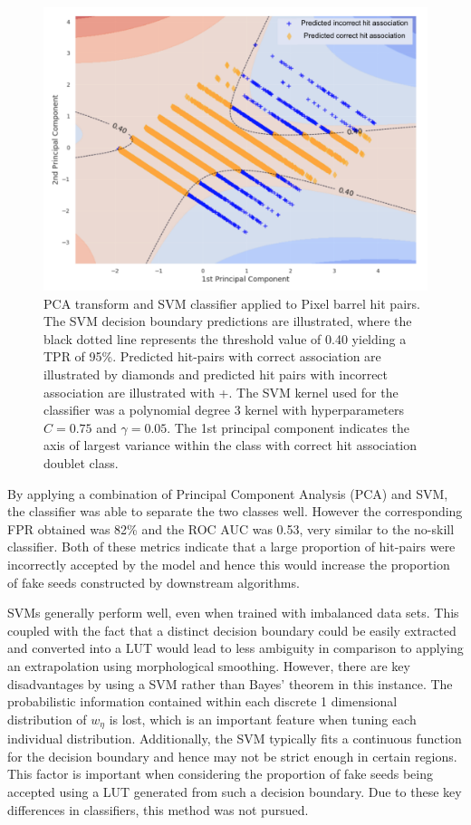 \begin{figure}[htbp]
\centering
\includegraphics[width=0.87\linewidth]{images/4-ml-based-predictor/barrel-svm-pca.png}
\caption{PCA transform and SVM classifier applied to Pixel barrel hit pairs. The SVM decision boundary predictions are illustrated, where the black dotted line represents the threshold value of 0.40 yielding a TPR of 95\%. Predicted hit-pairs with correct association are illustrated by diamonds and predicted hit pairs with incorrect association are illustrated with +. The SVM kernel used for the classifier was a polynomial degree 3 kernel with hyperparameters $C=0.75$ and $\gamma=0.05$. The 1st principal component indicates the axis of largest variance within the class with correct hit association doublet class.}
\label{fig:barrel-svm-pca}
\end{figure}

By applying a combination of Principal Component Analysis (PCA) and SVM, the classifier was able to separate the two classes well. However the corresponding FPR obtained was 82\% and the ROC AUC was 0.53, very similar to the no-skill classifier. Both of these metrics indicate that a large proportion of hit-pairs were incorrectly accepted by the model and hence this would increase the proportion of fake seeds constructed by downstream algorithms.

SVMs generally perform well, even when trained with imbalanced data sets. This coupled with the fact that a distinct decision boundary could be easily extracted and converted into a LUT would lead to less ambiguity in comparison to applying an extrapolation using morphological smoothing. However, there are key disadvantages by using a SVM rather than Bayes' theorem in this instance. The probabilistic information contained within each discrete 1 dimensional distribution of $w_{\eta}$ is lost, which is an important feature when tuning each individual distribution. Additionally, the SVM typically fits a continuous function for the decision boundary and hence may not be strict enough in certain regions. This factor is important when considering the proportion of fake seeds being accepted using a LUT generated from such a decision boundary. Due to these key differences in classifiers, this method was not pursued.


